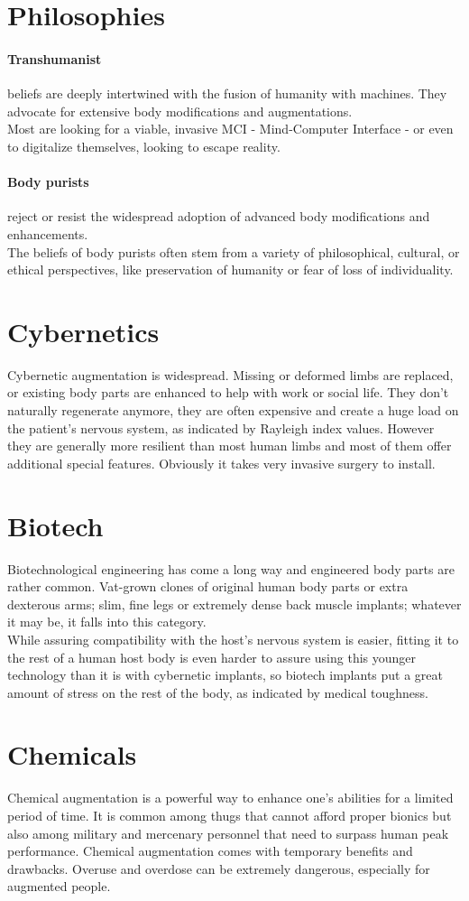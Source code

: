 \section{Philosophies}
\paragraph{Transhumanist}
beliefs are deeply intertwined with the fusion of humanity with machines.
They advocate for extensive body modifications and augmentations.\\
Most are looking for a viable, invasive MCI - Mind-Computer Interface -
	or even to digitalize themselves,
	looking to escape reality.
\paragraph{Body purists} reject or resist the widespread adoption of advanced body modifications and enhancements.\\
The beliefs of body purists often stem from a variety of philosophical, cultural, or ethical perspectives, like preservation of humanity or fear of loss of individuality.

\section{Cybernetics}
Cybernetic augmentation is widespread.
Missing or deformed limbs are replaced,
	or existing body parts are enhanced to help with work or social life.
They don’t naturally regenerate anymore,
	they are often expensive
	and create a huge load on the patient’s nervous system,
	as indicated by Rayleigh index values.
However they are generally more resilient than most human limbs
	and most of them offer additional special features.
Obviously it takes very invasive surgery to install.
\section{Biotech}
Biotechnological engineering has come a long way and engineered body parts are rather common. Vat-grown clones of original human body parts or extra dexterous arms; slim, fine legs or extremely dense back muscle implants; whatever it may be, it falls into this category.\\
While assuring compatibility with the host's nervous system is easier, fitting it to the rest of a human host body is even harder to assure using this younger technology than it is with cybernetic implants, so biotech implants put a great amount of stress on the rest of the body, as indicated by medical toughness.
\section{Chemicals}
Chemical augmentation is a powerful way to enhance one’s abilities for a limited period of time.
It is common among thugs that cannot afford proper bionics but also among military
	and mercenary personnel that need to surpass human peak performance.
Chemical augmentation comes with temporary benefits
	and drawbacks.
Overuse and overdose can be extremely dangerous,
	especially for augmented people.

